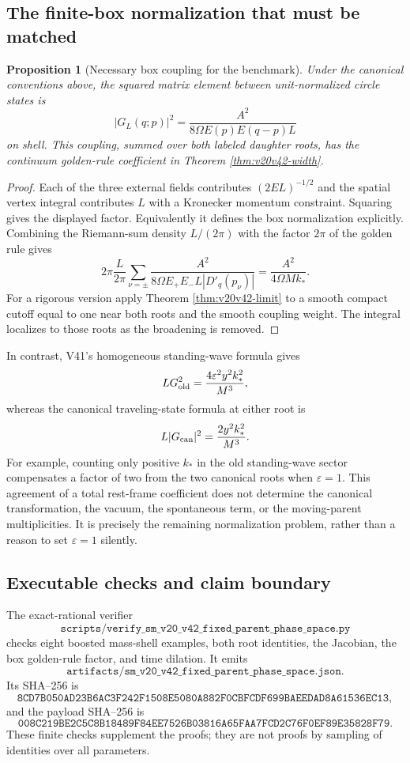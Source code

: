 \documentclass[11pt]{article}
\newtheorem{proposition}[theorem]{Proposition}
\theoremstyle{remark}
\begin{document}
\subsection{The finite-box normalization that must be matched}

\begin{proposition}[Necessary box coupling for the benchmark]
\label{prop:v20v42-box}
Under the canonical conventions above, the squared matrix element
between unit-normalized circle states is
\[
 |G_L(q;p)|^2=\frac{A^2}{8\Omega E(p)E(q-p)L}
\]
on shell.  This coupling, summed over both labeled daughter roots,
has the continuum golden-rule coefficient in
Theorem \ref{thm:v20v42-width}.
\end{proposition}
\begin{proof}
Each of the three external fields contributes
\((2EL)^{-1/2}\) and the spatial vertex integral contributes \(L\)
with a Kronecker momentum constraint.  Squaring gives the displayed
factor.  Equivalently it defines the box normalization explicitly.
Combining the Riemann-sum density \(L/(2\pi)\) with the factor \(2\pi\)
of the golden rule gives
\[
 2\pi\frac L{2\pi}\sum_{\nu=\pm}
 \frac{A^2}{8\Omega E_+E_-L|D'_q(p_\nu)|}
 =\frac{A^2}{4\Omega Mk_*}.
\]
For a rigorous version apply Theorem \ref{thm:v20v42-limit} to a
smooth compact cutoff equal to one near both roots and the smooth
coupling weight.  The integral localizes to those roots as
the broadening is removed.
\end{proof}

In contrast, V41's homogeneous standing-wave formula gives
\[
 L G_{\rm old}^2
 =\frac{4\varepsilon^2y^2 k_*^2}{M^3},
\]
whereas the canonical traveling-state formula at either root is
\[
 L |G_{\rm can}|^2=\frac{2y^2 k_*^2}{M^3}.
\]
For example, counting only positive \(k_*\) in the old standing-wave
sector compensates a factor of two from the two canonical roots
when \(\varepsilon=1\).  This agreement of a total rest-frame
coefficient does not determine the canonical transformation, the
vacuum, the spontaneous term, or the moving-parent multiplicities.
It is precisely the remaining normalization problem, rather than a
reason to set \(\varepsilon=1\) silently.

\subsection{Executable checks and claim boundary}

The exact-rational verifier
\[
 \texttt{scripts/verify\_sm\_v20\_v42\_fixed\_parent\_phase\_space.py}
\]
checks eight boosted mass-shell examples, both root identities, the
Jacobian, the box golden-rule factor, and time dilation.  It emits
\[
 \texttt{artifacts/sm\_v20\_v42\_fixed\_parent\_phase\_space.json}.
\]
Its SHA--256 is
\[
\texttt{8CD7B050AD23B6AC3F242F1508E5080A882F0CBFCDF699BAEEDAD8A61536EC13},
\]
and the payload SHA--256 is
\[
\texttt{008C219BE2C5C8B18489F84EE7526B03816A65FAA7FCD2C76F0EF89E35828F79}.
\]
These finite checks supplement the proofs; they are not proofs by
sampling of identities over all parameters.
\end{document}
